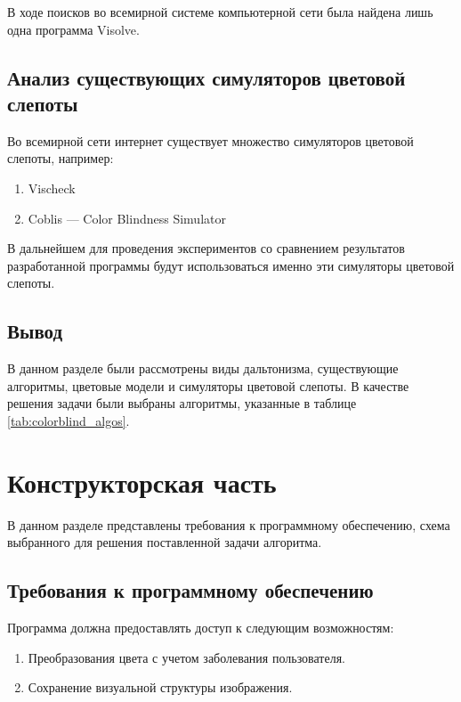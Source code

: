 \documentclass[a4paper,14pt, unknownkeysallowed]{extreport}
\begin{document}
    В ходе поисков во всемирной системе компьютерной сети была найдена лишь одна программа Visolve.

    \section{Анализ существующих симуляторов цветовой слепоты}

    Во всемирной сети интернет существует множество симуляторов цветовой слепоты, например:

    \begin{enumerate}
        \item Vischeck
        \item Coblis — Color Blindness Simulator
    \end{enumerate}

    В дальнейшем для проведения экспериментов со сравнением результатов разработанной программы будут использоваться именно эти симуляторы цветовой слепоты.

    \section*{Вывод}

    В данном разделе были рассмотрены виды дальтонизма, существующие алгоритмы, цветовые модели и симуляторы цветовой слепоты. В качестве решения задачи были выбраны алгоритмы, указанные в таблице \ref{tab:colorblind_algos}.

    \chapter{Конструкторская часть}

    В данном разделе представлены требования к программному обеспечению, схема выбранного для решения поставленной задачи алгоритма.

    \section{Требования к программному обеспечению}

    Программа должна предоставлять доступ к следующим возможностям:
    \begin{enumerate}
        \item Преобразования цвета с учетом заболевания пользователя.
        \item Сохранение визуальной структуры изображения.
    \end{enumerate}
\end{document}
